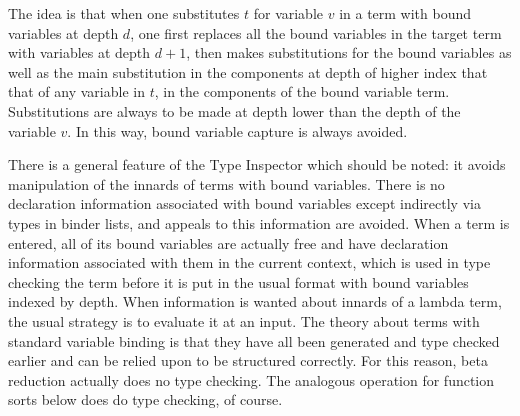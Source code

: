 \documentclass[12pt]{article}
\begin{document}
The idea is that when one substitutes $t$ for variable $v$ in a term with bound variables at depth $d$, one first replaces all the bound variables in the target term
with variables at depth $d+1$, then makes substitutions for the bound variables as well as the main substitution in the components at depth of higher index that that
of any variable in $t$, in the components of the bound variable term.  Substitutions are always to be made at depth lower than the depth of the variable $v$.  In this way,
bound variable capture is always avoided.

There is a general feature of the Type Inspector which should be noted:  it avoids manipulation of the innards of terms with bound variables.  There is no declaration information
associated with bound variables except indirectly via types in binder lists, and appeals to this information are avoided.  When a term is entered, all of its bound variables
are actually free and have declaration information associated with them in the current context, which is used in type checking the term before it is put in the usual
format with bound variables indexed by depth.  When information is wanted about innards of a lambda term, the usual strategy is to evaluate it at an input.  The theory about
terms with standard variable binding is that they have all been generated and type checked earlier and can be relied upon to be structured correctly.  For this reason,
beta reduction actually does no type checking.  The analogous operation for function sorts below does do type checking, of course.

\newpage
\end{document}
